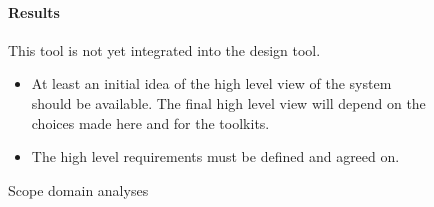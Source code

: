 \begin{figure}[!h]
{\begin{boxedminipage}[b]{.32\textwidth}
{	    \paragraph{Results} This tool is not yet integrated into the design
tool.
	}%
    \end{boxedminipage}
    }%

    \begin{boxedminipage}[c]{.8\textwidth}
    \begin{itemize}
	\item At least an initial idea of the high level view of the system
should be available. The final high level
		view will depend on the choices made here and for the toolkits.
	\item The high level requirements must be defined and agreed on.
    \end{itemize}
    \end{boxedminipage}


    \caption{Scope domain analyses}
    \label{fig: domain-analysis}
\end{figure}
